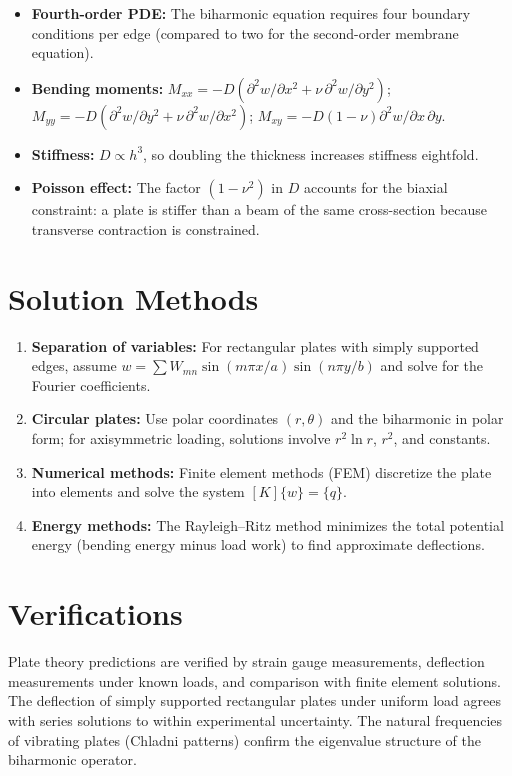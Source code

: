 \begin{itemize}
  \item \textbf{Fourth-order PDE:} The biharmonic equation requires four boundary conditions per edge (compared to two for the second-order membrane equation).
  \item \textbf{Bending moments:} $M_{xx} = -D(\partial^{2}w/\partial x^{2} + \nu\,\partial^{2}w/\partial y^{2})$; $M_{yy} = -D(\partial^{2}w/\partial y^{2} + \nu\,\partial^{2}w/\partial x^{2})$; $M_{xy} = -D(1-\nu)\partial^{2}w/\partial x\,\partial y$.
  \item \textbf{Stiffness:} $D \propto h^{3}$, so doubling the thickness increases stiffness eightfold.
  \item \textbf{Poisson effect:} The factor $(1-\nu^{2})$ in $D$ accounts for the biaxial constraint: a plate is stiffer than a beam of the same cross-section because transverse contraction is constrained.
\end{itemize}
\section*{Solution Methods}

\begin{enumerate}
  \item \textbf{Separation of variables:} For rectangular plates with simply supported edges, assume $w = \sum W_{mn}\sin(m\pi x/a)\sin(n\pi y/b)$ and solve for the Fourier coefficients.
  \item \textbf{Circular plates:} Use polar coordinates $(r,\theta)$ and the biharmonic in polar form; for axisymmetric loading, solutions involve $r^{2}\ln r$, $r^{2}$, and constants.
  \item \textbf{Numerical methods:} Finite element methods (FEM) discretize the plate into elements and solve the system $[K]\{w\} = \{q\}$.
  \item \textbf{Energy methods:} The Rayleigh--Ritz method minimizes the total potential energy (bending energy minus load work) to find approximate deflections.
\end{enumerate}
\section*{Verifications}

Plate theory predictions are verified by strain gauge measurements, deflection measurements under known loads, and comparison with finite element solutions. The deflection of simply supported rectangular plates under uniform load agrees with series solutions to within experimental uncertainty. The natural frequencies of vibrating plates (Chladni patterns) confirm the eigenvalue structure of the biharmonic operator.
